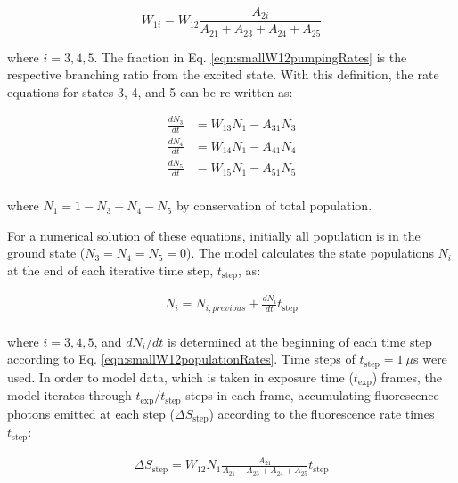 \begin{equation}
W_{1i} = W_{12}\frac{A_{2i}}{A_{21} + A_{23} + A_{24} + A_{25}}
\label{eqn:smallW12pumpingRates}
\end{equation}

\noindent
where $i = 3,4,5$.  The fraction in Eq. \ref{eqn:smallW12pumpingRates} is the respective branching ratio from the excited state.  With this definition, the rate equations for states 3, 4, and 5 can be re-written as:


\begin{equation}
\begin{aligned}
\frac{dN_3}{dt} &= W_{13}N_{1} - A_{31}N_{3} \\
\frac{dN_4}{dt} &= W_{14}N_{1} - A_{41}N_{4} \\
\frac{dN_5}{dt} &= W_{15}N_{1} - A_{51}N_{5} \\
\end{aligned}
\label{eqn:smallW12populationRates}
\end{equation}

\noindent
where $N_{1} = 1 - N_{3} - N_{4} - N_{5}$ by conservation of total population.

For a numerical solution of these equations, initially all population is in the ground state ($N_{3} = N_{4} = N_{5} = 0$).  The model calculates the state populations $N_{i}$ at the end of each iterative time step, $t_{\text{step}}$, as:

\begin{equation}
\begin{aligned}
N_{i} = N_{i, previous} + \frac{dN_i}{dt}t_{\text{step}} \\
\end{aligned}
\label{eqn:smallW12populations}
\end{equation}

\noindent
where $i = 3,4,5$, and $dN_i/dt$ is determined at the beginning of each time step according to Eq. \ref{eqn:smallW12populationRates}.  Time steps of $t_{\text{step}} = 1~\mu$s were used.  In order to model data, which is taken in exposure time ($t_{\text{exp}}$) frames, the model iterates through $t_{\text{exp}}/t_{\text{step}}$ steps in each frame, accumulating fluorescence photons emitted at each step ($\Delta S_{\text{step}}$) according to the fluorescence rate times $t_{\text{step}}$:

\begin{equation}
\begin{aligned}
\Delta S_{\text{step}} = W_{12}  N_{1} \frac{A_{21}}{A_{21} + A_{23} + A_{24} + A_{25}}t_{\text{step}} \\
\end{aligned}
\label{eqn:smallW12counts}
\end{equation}

